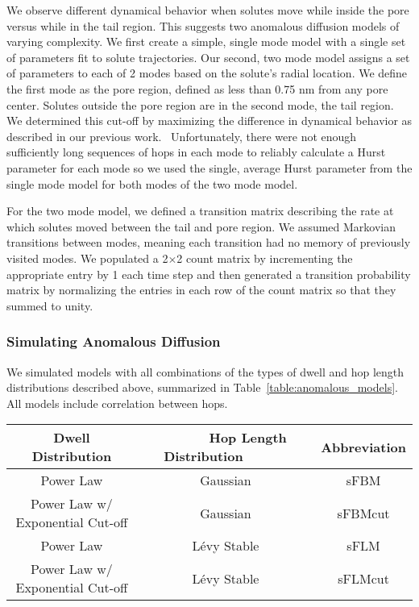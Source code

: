 \documentclass[journal=ancac3,manuscript=article,layout=twocolumn]{achemso}
\begin{document}
  We observe different dynamical behavior when solutes move while inside the
  pore versus while in the tail region. This suggests two anomalous diffusion
  models of varying complexity. We first create a simple, single mode model
  with a single set of parameters fit to solute trajectories. Our second, two
  mode model assigns a set of parameters to each of 2 modes based on the
  solute's radial location. We define the first mode as the pore region,
  defined as less than 0.75 nm from any pore center. Solutes outside the pore
  region are in the second mode, the tail region. We determined this cut-off by
  maximizing the difference in dynamical behavior as described in our previous
  work.~\cite{coscia_chemically_2019} Unfortunately, there were not enough
  sufficiently long sequences of hops in each mode to reliably calculate a
  Hurst parameter for each mode so we used the single, average Hurst parameter
  from the single mode model for both modes of the two mode model.
 
  For the two mode model, we defined a transition matrix describing the rate at
  which solutes moved between the tail and pore region. We assumed Markovian
  transitions between modes, meaning each transition had no memory of
  previously visited modes. We populated a 2$\times$2 count matrix by
  incrementing the appropriate entry by 1 each time step and then generated a
  transition probability matrix by normalizing the entries in each row of the
  count matrix so that they summed to unity.
  
  \subsubsection*{Simulating Anomalous Diffusion}

  We simulated models with all combinations of the types of dwell and hop length
  distributions described above, summarized in Table~\ref{table:anomalous_models}.
  All models include correlation between hops.

  \begin{table*}[!htb]
	  \centering
	  \begin{tabular}{ccc}
            \hline
	  \hline
	  Dwell Distribution                & ~~~~~~Hop Length Distribution~~~~~~ & Abbreviation \\
	  \hline
      Power Law                         & Gaussian                & sFBM         \\
      Power Law w/ Exponential Cut-off  & Gaussian                & sFBMcut      \\
      Power Law                         & L\'evy Stable           & sFLM         \\
      Power Law w/ Exponential Cut-off  & L\'evy Stable           & sFLMcut      \\
	  \hline
          \hline
	  \end{tabular}
	  \caption{We tested four anomalous diffusion models with various modifications 
	  to the dwell and hop length distributions. We incorporate hop correlation 
	  into all models.}\label{table:anomalous_models}
          
 \end{table*}
\end{document}
